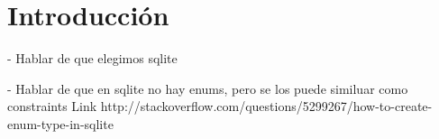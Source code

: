 \section{Introducción}


- Hablar de que elegimos sqlite

- Hablar de que en sqlite no hay enums, pero se los puede similuar como constraints
Link http://stackoverflow.com/questions/5299267/how-to-create-enum-type-in-sqlite


